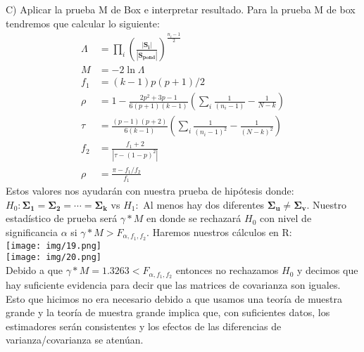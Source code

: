 \begin{sol}
\pagebreak
C) Aplicar la prueba M de Box e interpretar resultado.
Para la prueba M de box tendremos que calcular lo siguiente:
\begin{align*}
\Lambda &= \prod_{i}(\frac{|\bm{S_i}|}{|\bm{S_{pond}}|})^{\frac{n_i-1}{2}}  \\
M &= -2\ln{\Lambda}\\
f_1 &= (k-1)p(p+1)/2\\
\rho &= 1- \frac{2p^2+3p-1}{6(p+1)(k-1)}(\sum_i\frac{1}{(n_i-1)}-\frac{1}{N-k})\\
\tau &= \frac{(p-1)(p+2)}{6(k-1)}(\sum_i\frac{1}{(n_i-1)^2}-\frac{1}{(N-k)^2})\\
f_2 &= \frac{f_1+2}{|\tau-(1-p)^2|}\\
\rho &= \frac{\pi-f_1/f_2}{f_1}
\end{align*}
Estos valores nos ayudarán con nuestra prueba de hipótesis donde: $H_0:\bm{\Sigma_1=\Sigma_2=\cdots = \Sigma_k}$ vs $H_1:$ Al menos hay dos diferentes $\bm{\Sigma_u} \neq \bm{\Sigma_v}$. Nuestro estadístico de prueba será $\gamma* M$ en donde se rechazará $H_0$ con nivel de significancia $\alpha$ si $\gamma*M>F_{\alpha,f_1,f_2}$. Haremos nuestros cálculos en R:\\
\texttt{[image: img/19.png]}\\
\texttt{[image: img/20.png]}\\
Debido a que $\gamma* M = 1.3263 < F_{\alpha,f_1,f_2}$ entonces no rechazamos $H_0$ y decimos que hay suficiente evidencia para decir que las matrices de covarianza son iguales. Esto que hicimos no era necesario debido a que usamos una teoría de muestra grande y la teoría de muestra grande implica que, con suficientes datos, los estimadores serán consistentes y los efectos de las diferencias de varianza/covarianza se atenúan. 
\end{sol}